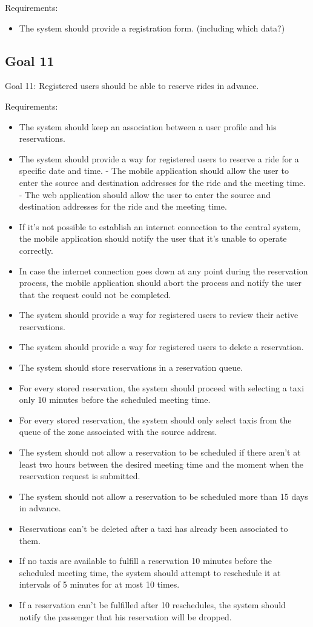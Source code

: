 Requirements:
\begin{itemize}
\item The system should provide a registration form. (including which data?)
\end{itemize}

\subsection{Goal 11}
Goal 11: Registered users should be able to reserve rides in advance.

Requirements:
\begin{itemize}
\item The system should keep an association between a user profile and his reservations.
\item The system should provide a way for registered users to reserve a ride for a specific date and time.
	- The mobile application should allow the user to enter the source and destination addresses for the ride and the meeting time.
	- The web application should allow the user to enter the source and destination addresses for the ride and the meeting time.
\item If it’s not possible to establish an internet connection to the central system, the mobile application should notify the user that it’s unable to operate correctly.
\item In case the internet connection goes down at any point during the reservation process, the mobile application should abort the process and notify the user that the request could not be completed.
\item The system should provide a way for registered users to review their active reservations.
\item The system should provide a way for registered users to delete a reservation.
\item The system should store reservations in a reservation queue. 
\item For every stored reservation, the system should proceed with selecting a taxi only 10 minutes before the scheduled meeting time.
\item For every stored reservation, the system should only select taxis from the queue of the zone associated with the source address.
\item The system should not allow a reservation to be scheduled if there aren’t at least two hours between the desired meeting time and the moment when the reservation request is submitted. 
\item The system should not allow a reservation to be scheduled more than 15 days in advance.
\item Reservations can’t be deleted after a taxi has already been associated to them.
\item If no taxis are available to fulfill a reservation 10 minutes before the scheduled meeting time, the system should attempt to reschedule it at intervals of 5 minutes for at most 10 times.
\item If a reservation can’t be fulfilled after 10 reschedules, the system should notify the passenger that his reservation will be dropped. 
\end{itemize}

